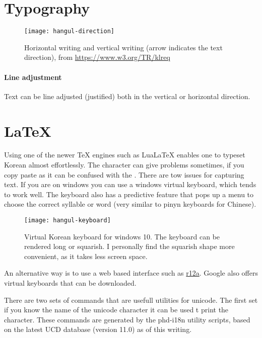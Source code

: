 \section{Typography}


\begin{figure}[htbp]
\texttt{[image: hangul-direction]}
\caption[Korean horizontal and vertical writing]{Horizontal writing and vertical writing (arrow indicates the text direction), from \protect\url{https://www.w3.org/TR/klreq}}
\end{figure}

\paragraph{Line adjustment}

Text can be line adjusted (justified) both in the vertical or horizontal direction. 


\section{LaTeX}

Using one of the newer TeX engines such as LuaLaTeX enables one to typeset Korean almost effortlessly. 
The character  can give problems sometimes, if you copy paste as it can be confused with the \textbar. There are tow issues for capturing text. If you are on windows you can use a windows virtual keyboard, which tends to work well. The keyboard also has a predictive feature that pops up a menu to choose the correct syllable or word (very similar to pinyn keyboards for Chinese).

\begin{figure}[htbp]
\centering

\texttt{[image: hangul-keyboard]}

\caption{Virtual Korean keyboard for windows 10. The keyboard can be rendered long or squarish. I personally find the squarish shape more convenient, as it takes less screen space.}

\end{figure}

An alternative way is to use a web based interface such as \href{https://r12a.github.io/pickers/}{r12a}. Google also offers virtual keyboards that can be downloaded.


There are two sets of commands that are usefull utilities for unicode. The first set if you know the name of the 
unicode character it can be used t print the character. These commands are generated by the phd-i18n utility scripts, based
on the latest UCD database (version 11.0) as of this writing.

